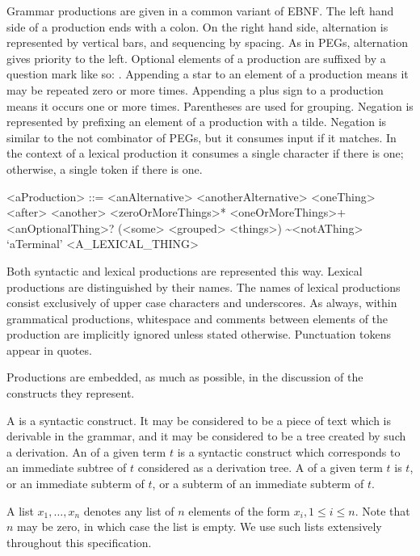 \documentclass[makeidx]{article}
\begin{document}
\LMHash{}%
Grammar productions are given in a common variant of EBNF.
The left hand side of a production ends with a colon.
On the right hand side, alternation is represented by vertical bars, and sequencing by spacing.
As in PEGs, alternation gives priority to the left.
Optional elements of a production are suffixed by a question mark like so: .
Appending a star to an element of a production means it may be repeated zero or more times.
Appending a plus sign to a production means it occurs one or more times.
Parentheses are used for grouping.
Negation is represented by prefixing an element of a production with a tilde.
Negation is similar to the not combinator of PEGs, but it consumes input if it matches.
In the context of a lexical production it consumes a single character if there is one; otherwise, a single token if there is one.


\begin{grammar}\color{commentaryColor}
<aProduction> ::= <anAlternative>
  \alt <anotherAlternative>
  \alt <oneThing> <after> <another>
  \alt <zeroOrMoreThings>*
  \alt <oneOrMoreThings>+
  \alt <anOptionalThing>?
  \alt (<some> <grouped> <things>)
  \alt \~{}<notAThing>
  \alt `aTerminal'
  \alt <A\_LEXICAL\_THING>
\end{grammar}

\LMHash{}%
Both syntactic and lexical productions are represented this way.
Lexical productions are distinguished by their names.
The names of lexical productions consist exclusively of upper case characters and underscores.
As always, within grammatical productions, whitespace and comments between elements of the production are implicitly ignored unless stated otherwise.
Punctuation tokens appear in quotes.

\LMHash{}%
Productions are embedded, as much as possible, in the discussion of the constructs they represent.

\LMHash{}%
A  is a syntactic construct.
It may be considered to be a piece of text which is derivable in the grammar,
and it may be considered to be a tree created by such a derivation.
An  of a given term $t$ is a syntactic construct
which corresponds to an immediate subtree of $t$ considered as a derivation tree.
A  of a given term $t$ is $t$,
or an immediate subterm of $t$,
or a subterm of an immediate subterm of $t$.

\LMHash{}%
A list $x_1, \ldots, x_n$ denotes any list of $n$ elements of the form $x_i, 1 \le i \le n$.
Note that $n$ may be zero, in which case the list is empty.
We use such lists extensively throughout this specification.
\end{document}
